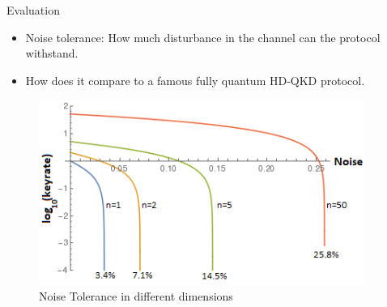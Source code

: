 \documentclass[final]{beamer}
\newlength{\onecolwid}
\newlength{\twocolwid}
\begin{document}
\begin{frame}[t]
\begin{columns}[t]
\begin{column}{\twocolwid}
\begin{columns}[t,totalwidth=\twocolwid]
\begin{column}{\onecolwid}

\end{column} %

\begin{column}{\onecolwid} %


\begin{block}{Evaluation}

\begin{itemize}
\item Noise tolerance: How much disturbance in the channel can the protocol withstand. 
\item How does it compare to a famous fully quantum HD-QKD protocol.
\end{itemize}
\begin{figure}
	\includegraphics[width=.9\linewidth]{keyrate-ind.png}
	\caption{Noise Tolerance in different dimensions}
	\end{figure}




\end{block}


\end{column} %


\end{columns}
\end{column}
\end{columns}
\end{frame}
\end{document}

